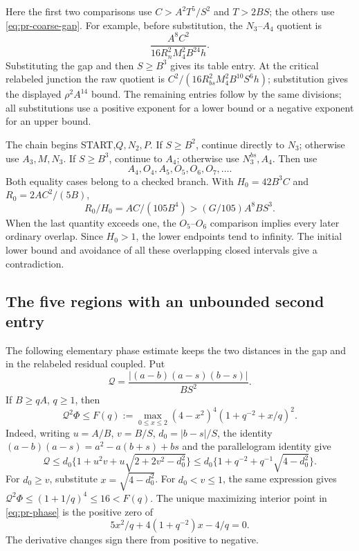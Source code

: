 \documentclass[12pt]{article}
\numberwithin{equation}{section}
\begin{document}
Here the first two comparisons use
\(C>A^2T^5/S^2\) and \(T>2BS\); the others use
\eqref{eq:pr-coarse-gap}. For example, before substitution, the
\(N_3\)--\(A_4\) quotient is
\[
 \frac{A^8C^2}{16R_n^2M_4^2B^{24}h}.
\]
Substituting the gap and then \(S\ge B^3\) gives its table entry.
At the critical relabeled junction the raw quotient is
\(C^2/(16R_{bs}^2M_4^2B^{10}S^6h)\);
substitution gives the displayed \(\rho^2A^{14}\) bound.
The remaining entries follow by the same divisions; all substitutions
use a positive exponent for a lower bound or a negative exponent for an
upper bound.

The chain begins START,\(Q,N_2,P\). If \(S\ge B^2\), continue directly
to \(N_3\); otherwise use \(A_3,M,N_3\). If \(S\ge B^3\), continue
to \(A_4\); otherwise use \(N_3^{bs},A_4\). Then use
\[
 A_4,O_4,A_5,O_5,O_6,O_7,\ldots .
\]
Both equality cases belong to a checked branch. With
\(H_0=42B^3C\) and \(R_0=2AC^2/(5B)\),
\[
 R_0/H_0=AC/(105B^4)>(G/105)A^8BS^3.
\]
When the last quantity exceeds one, the \(O_5\)--\(O_6\) comparison
implies every later ordinary overlap. Since \(H_0>1\), the lower
endpoints tend to infinity. The initial lower bound and avoidance of
all these overlapping closed intervals give a contradiction.

\subsection{The five regions with an unbounded second entry}

The following elementary phase estimate keeps the two distances in the
gap and in the relabeled residual coupled. Put
\[
 \mathcal Q=\frac{|(a-b)(a-s)(b-s)|}{BS^2}.
\]
If \(B\ge qA\), \(q\ge1\), then
\begin{equation}\label{eq:pr-phase}
 \mathcal Q^2\Phi\le
 F(q):=\max_{0\le x\le2}(4-x^2)^4(1+q^{-2}+x/q)^2.
\end{equation}
Indeed, writing \(u=A/B\), \(v=B/S\), \(d_0=|b-s|/S\), the identity
\((a-b)(a-s)=a^2-a(b+s)+bs\) and the parallelogram identity give
\[
 \mathcal Q\le d_0\{1+u^2v+u\sqrt{2+2v^2-d_0^2}\}
 \le d_0\{1+q^{-2}+q^{-1}\sqrt{4-d_0^2}\}.
\]
For \(d_0\ge v\), substitute \(x=\sqrt{4-d_0^2}\).
For \(d_0<v\le1\), the same expression gives
\(\mathcal Q^2\Phi\le(1+1/q)^4\le16<F(q)\).
The unique maximizing interior point in \eqref{eq:pr-phase} is the
positive zero of
\begin{equation}\label{eq:pr-phase-critical}
 5x^2/q+4(1+q^{-2})x-4/q=0.
\end{equation}
The derivative changes sign there from positive to negative.
\end{document}
